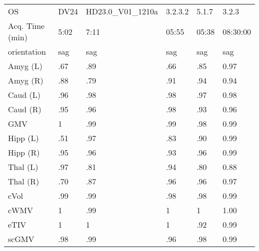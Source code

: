 \begin{table}
\begin{tabular}{llllll}
OS                    &                      DV24 &            HD23.0\_V01\_1210a &               3.2.3.2 &              5.1.7 &                3.2.3 \\
Acq. Time (min)       &               5:02 &  7:11 &              05:55 &           05:38 &             08:30:00 \\
orientation           &               sag &                         sag &                   sag &                sag &                  sag \\
Amyg (L)              &                   .67 &                        .89 &                  .66 &               .85 &                 0.97 \\
Amyg (R)              &                   .88 &                        .79 &                  .91 &               .94 &                 0.94 \\
Caud (L)              &                   .96 &                        .98 &                  .98 &               .97 &                 0.98 \\
Caud (R)              &                   .95 &                        .96 &                  .98 &               .93 &                 0.96 \\
GMV                   &                   1 &                        .99 &                  .99 &               .98 &                 0.99 \\
Hipp (L)              &                   .51 &                        .97 &                  .83 &               .90 &                 0.99 \\
Hipp (R)              &                   .95 &                        .96 &                  .93 &               .96 &                 0.99 \\
Thal (L)              &                   .97 &                        .81 &                  .94 &               .80 &                 0.88 \\
Thal (R)              &                   .70 &                        .87 &                  .96 &               .96 &                 0.97 \\
cVol                  &                   .99 &                        .99 &                  .98 &               .98 &                 0.99 \\
cWMV                  &                   1 &                        .99 &                  1 &               1 &                 1.00 \\
eTIV                  &                   1 &                        1 &                  1 &               .92 &                 0.99 \\
scGMV                 &                   .98 &                        .99 &                  .96 &               .98 &                 0.99 \\
\bottomrule
\end{tabular}


\end{table}
